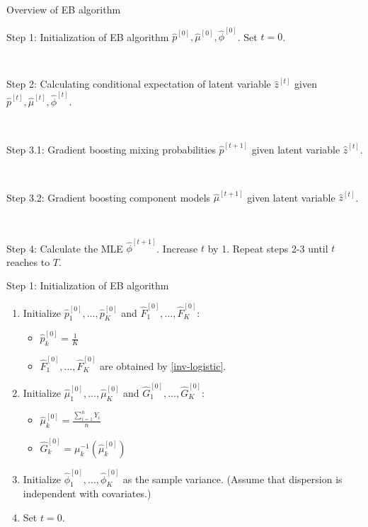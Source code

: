 \documentclass[professionalfont]{beamer}
\begin{document}
\begin{frame}{Overview of EB algorithm}

	Step 1: Initialization of EB algorithm $\hat{p}^{[0]},\hat{\mu}^{[0]},\hat{\phi}^{[0]}$. Set $t=0$.

	~

	Step 2: Calculating conditional expectation of latent variable $\hat{z}^{[t]}$ given $\hat{p}^{[t]},\hat{\mu}^{[t]},\hat{\phi}^{[t]}$.

	~

	Step 3.1: Gradient boosting mixing probabilities $\hat{p}^{[t+1]}$  given latent variable $\hat{z}^{[t]}$.

	~

	Step 3.2: Gradient boosting component models $\hat{\mu}^{[t+1]}$ given latent variable $\hat{z}^{[t]}$.

	~

	Step 4: Calculate the MLE $\hat{\phi}^{[t+1]}$. Increase $t$ by 1. Repeat steps 2-3 until $t$ reaches to $T$.
\end{frame}

\begin{frame}{Step 1: Initialization of EB algorithm}
\begin{enumerate}
	\item Initialize $\hat{p}_1^{[0]}, \ldots,\hat{p}_K^{[0]}$ and   $\hat{F}_1^{[0]}, \ldots, \hat{F}_{K}^{[0]}$:

	\begin{itemize}
		\item 	$\hat{p}_k^{[0]}=\frac{1}{K}$
		\item $\hat{F}_1^{[0]}, \ldots, \hat{F}_{K}^{[0]}$ are obtained by \eqref{inv-logistic}.
	\end{itemize}
\item
Initialize $\hat{\mu}_1^{[0]},\ldots,\hat{\mu}_K^{[0]}$ and  $\hat{G}_1^{[0]},\ldots,\hat{G}_K^{[0]}$:

\begin{itemize}
	\item $\hat{\mu}_k^{[0]}=\frac{\sum_{i=1}^nY_i}{n}$
	\item $\hat{G}_k^{[0]}=\mu_k^{-1}(\hat{\mu}_k^{[0]})$
\end{itemize}
\item Initialize $\hat{\phi}_1^{[0]},\ldots, \hat{\phi}_K^{[0]}$ as the sample variance. (Assume that dispersion is independent with covariates.)
\item 	Set $t=0$.
\end{enumerate}

\end{frame}
\end{document}
